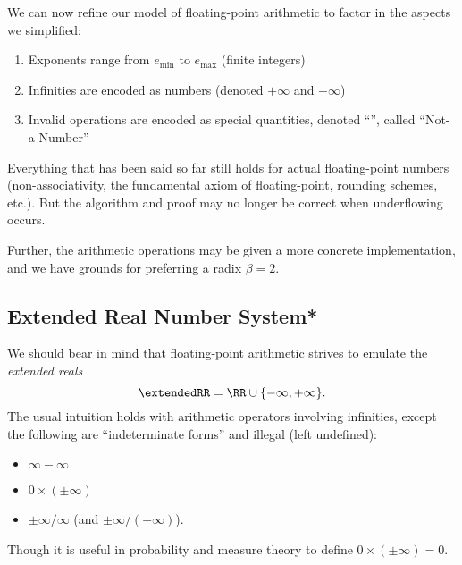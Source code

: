We can now refine our model of floating-point arithmetic to factor in
the aspects we simplified:
\begin{enumerate}
\item Exponents range from $e_{\text{min}}$ to $e_{\text{max}}$ (finite integers)
\item Infinities are encoded as numbers (denoted $+\infty$ and $-\infty$)
\item Invalid operations are encoded as special quantities, denoted
  ``\NaN'', called ``Not-a-Number''
\end{enumerate}
Everything that has been said so far still holds for actual 
floating-point numbers (non-associativity, the fundamental axiom of
floating-point, rounding schemes, etc.). But the algorithm and proof may
no longer be correct when underflowing occurs.

Further, the arithmetic operations may be given a more concrete
implementation, and we have grounds for preferring a radix $\beta=2$.

\subsection{Extended Real Number System*}

We should bear in mind that  floating-point arithmetic strives
to emulate the \emph{extended reals}
\begin{equation}
  \extendedRR = \RR\cup\{-\infty,+\infty\}.
\end{equation}
The usual intuition holds with arithmetic operators involving
infinities, except the following are ``indeterminate forms'' and illegal
(left undefined):
\begin{itemize}
\item $\infty-\infty$
\item $0\times(\pm\infty)$
\item $\pm\infty/\infty$ (and $\pm\infty/(-\infty)$).
\end{itemize}
Though it is useful in probability and measure theory to define
$0\times(\pm\infty)=0$.

